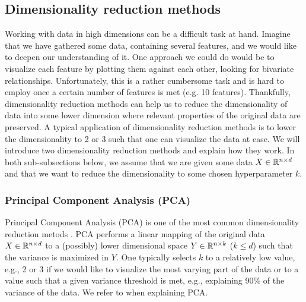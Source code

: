 \subsection{Dimensionality reduction methods}
Working with data in high dimensions can be a difficult task at hand. Imagine that we have gathered some data, containing several features, and we would like to deepen our understanding of it. One approach we could do would be to visualize each feature by plotting them against each other, looking for bivariate relationships. Unfortunately, this is a rather cumbersome task and is hard to employ once a certain number of features is met (e.g. 10 features). Thankfully, dimensionality reduction methods can help us to reduce the dimensionality of data into some lower dimension where relevant properties of the original data are preserved. A typical application of dimensionality reduction methods is to lower the dimensionality to 2 or 3 such that one can visualize the data at ease. We will introduce two dimensionality reduction methods and explain how they work. In both sub-subsections below, we assume that we are given some data $X \in \mathbb{R}^{n \times d}$ and that we want to reduce the dimensionality to some chosen hyperparameter $k$.

\subsubsection{Principal Component Analysis (PCA)}
\label{sec:pca}
Principal Component Analysis (PCA) is one of the most common dimensionality reduction metods \cite{Jolliffe2002}. PCA performs a linear mapping of the original data $X \in \mathbb{R}^{n \times d}$ to a (possibly) lower dimensional space $Y \in \mathbb{R}^{n \times k}$ ($k \leq d$) such that the variance is maximized in $Y$. One typically selects $k$ to a relatively low value, e.g., 2 or 3 if we would like to visualize the most varying part of the data or to a value such that a given variance threshold is met, e.g., explaining 90\% of the variance of the data. We refer to \cite{Jolliffe2002} when explaining PCA.

